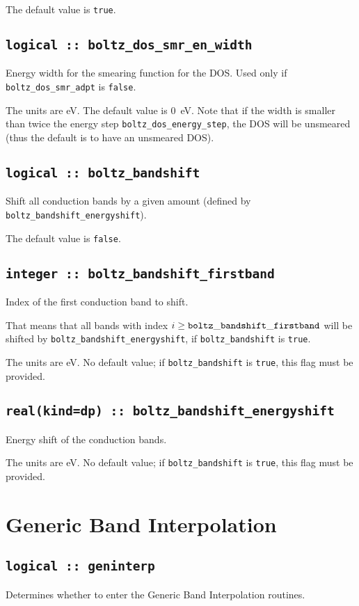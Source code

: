 The default value is \verb#true#.

\subsection[boltz\_dos\_smr\_en\_width]{\tt logical :: boltz\_dos\_smr\_en\_width}
Energy width for the smearing function for the DOS. Used only if {\tt boltz\_dos\_smr\_adpt} is \verb#false#.

The units are eV.
The default value is 0~eV. Note that if the width is smaller than twice the energy step {\tt boltz\_dos\_energy\_step}, the DOS will be unsmeared (thus the default is to have an unsmeared DOS).


\subsection[boltz\_bandshift]{\tt logical :: boltz\_bandshift}
Shift all conduction bands by a given amount (defined by {\tt boltz\_bandshift\_energyshift}).

The default value is \verb#false#.

\subsection[boltz\_bandshift\_firstband]{\tt integer :: boltz\_bandshift\_firstband}
Index of the first conduction band to shift.

That means that all bands with index $i\ge {\tt boltz\_bandshift\_firstband}$ will be shifted by  {\tt boltz\_bandshift\_energyshift}, if {\tt boltz\_bandshift} is \verb#true#.

The units are eV.
No default value; if {\tt boltz\_bandshift} is \verb#true#, this flag must be provided.

\subsection[boltz\_bandshift\_energyshift]{\tt real(kind=dp) :: boltz\_bandshift\_energyshift}
Energy shift of the conduction bands.

The units are eV.
No default value; if {\tt boltz\_bandshift} is \verb#true#, this flag must be provided.


\section{Generic Band Interpolation}
\subsection[boltzwann]{\tt logical :: geninterp}
Determines whether to enter the Generic Band Interpolation routines.

